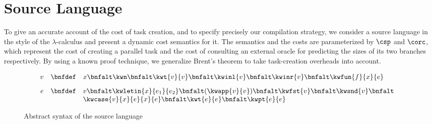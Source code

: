 \section{Source Language}
\label{sec:cost-semantics}

To give an accurate account of the cost of task creation, and to
specify precisely our compilation strategy, we consider a source
language in the style of the $\lambda$-calculus and present a dynamic
cost semantics for it.  The semantics and the costs are parameterized
by $\csp$ and $\corc$, which represent the cost of creating a parallel
task and the cost of consulting an external oracle for predicting the
sizes of its two branches respectively.  By using a known proof
technique, we generalize Brent's theorem to take task-creation
overheads into account.

\begin{figure}[t]
\centering
\[
\begin{array}{rcl}

v     
& \bnfdef       
& x \bnfalt \kwn \bnfalt \kwt{v}{v} \bnfalt \kwinl{v} \bnfalt
\kwinr{v} \bnfalt \kwfun{f}{x}{e}
\\[2ex]
e 
& \bnfdef       
&   v \bnfalt  \kwletin{x}{e_1}{e_2} \bnfalt (\kwapp{v}{v}) \bnfalt \kwfst{v} \bnfalt \kwsnd{v} \bnfalt  
\\
& & \kwcase{v}{x}{e}{x}{e} \bnfalt  \kwt{e}{e} \bnfalt \kwpt{e}{e}    \\
\end{array}
\]
\caption{Abstract syntax of the source language} %
\label{fig:src::syntax}
\end{figure}


